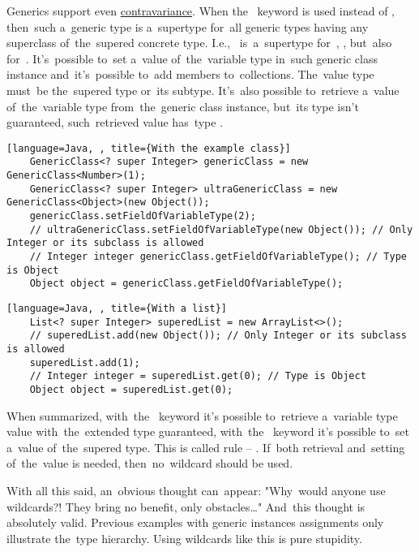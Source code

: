 \noindent Generics support even \hyperref[contravariance]{contravariance}.
When \mbox{the } keyword is used instead of , then~such a~generic type is a~supertype for~all generic types having any superclass of~the~supered concrete type.
I.e.,~ is~a~supertype for~, , but~also \mbox{for }.
It's~possible to~set a~value of~the~variable type in~such generic class instance and~it's~possible to~add members to~collections.
The~value type must~be the~supered type or~its subtype.
It's~also possible to~retrieve a~value of~the~variable type from~the~generic class instance, but~its type isn't guaranteed, such~retrieved value has~type .
\newpage

\begin{lstlisting}[language=Java, , title={With the example class}]
    GenericClass<? super Integer> genericClass = new GenericClass<Number>(1);
    GenericClass<? super Integer> ultraGenericClass = new GenericClass<Object>(new Object());
    genericClass.setFieldOfVariableType(2);
    // ultraGenericClass.setFieldOfVariableType(new Object()); // Only Integer or its subclass is allowed
    // Integer integer genericClass.getFieldOfVariableType(); // Type is Object
    Object object = genericClass.getFieldOfVariableType();
\end{lstlisting}
\begin{lstlisting}[language=Java, , title={With a list}]
    List<? super Integer> superedList = new ArrayList<>();
    // superedList.add(new Object()); // Only Integer or its subclass is allowed
    superedList.add(1);
    // Integer integer = superedList.get(0); // Type is Object
    Object object = superedList.get(0);
\end{lstlisting}
\newline

\noindent When summarized, \mbox{with the } keyword it's possible to~retrieve a~variable type value with~the~extended type guaranteed, \mbox{with the } keyword it's possible to~set a~value of~the~supered type.
This is called  rule -- .
If~both retrieval and~setting of~the~value is needed, then~no~wildcard should be used.

With all this said, an~obvious thought can~appear:
"Why~would anyone use wildcards?!
They bring no benefit, only obstacles\dots"
And~this thought is absolutely valid.
Previous examples with generic instances assignments only illustrate the~type hierarchy.
Using wildcards like this is pure stupidity.

